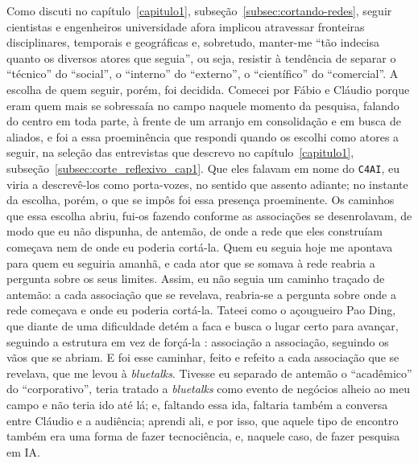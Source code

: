 Como discuti no capítulo~\ref{capitulo1}, subseção~\ref{subsec:cortando-redes}, seguir cientistas e engenheiros universidade afora implicou atravessar fronteiras disciplinares, temporais e geográficas e, sobretudo, manter-me \enquote{tão indecisa quanto os diversos atores que seguia}, ou seja, resistir à tendência de separar o \enquote{técnico} do \enquote{social}, o \enquote{interno} do \enquote{externo}, o \enquote{científico} do \enquote{comercial}. A escolha de quem seguir, porém, foi decidida. Comecei por Fábio e Cláudio porque eram quem mais se sobressaía no campo naquele momento da pesquisa, falando do centro em toda parte, à frente de um arranjo em consolidação e em busca de aliados, e foi a essa proeminência que respondi quando os escolhi como atores a seguir, na seleção das entrevistas que descrevo no capítulo~\ref{capitulo1}, subseção~\ref{subsec:corte_reflexivo_cap1}. Que eles falavam em nome do \texttt{C4AI}, eu viria a descrevê-los como porta-vozes, no sentido que assento adiante; no instante da escolha, porém, o que se impôs foi essa presença proeminente. Os caminhos que essa escolha abriu, fui-os fazendo conforme as associações se desenrolavam, de modo que eu não dispunha, de antemão, de onde a rede que eles construíam começava nem de onde eu poderia cortá-la. Quem eu seguia hoje me apontava para quem eu seguiria amanhã, e cada ator que se somava à rede reabria a pergunta sobre os seus limites. Assim, eu não seguia um caminho traçado de antemão: a cada associação que se revelava, reabria-se a pergunta sobre onde a rede começava e onde eu poderia cortá-la. Tateei como o açougueiro Pao Ding, que diante de uma dificuldade detém a faca e busca o lugar certo para avançar, seguindo a estrutura em vez de forçá-la \parencite[p.~88]{hui2020tecnodiversidade}: associação a associação, seguindo os vãos que se abriam. E foi esse caminhar, feito e refeito a cada associação que se revelava, que me levou à \textit{bluetalks}. Tivesse eu separado de antemão o \enquote{acadêmico} do \enquote{corporativo}, teria tratado a \textit{bluetalks} como evento de negócios alheio ao meu campo e não teria ido até lá; e, faltando essa ida, faltaria também a conversa entre Cláudio e a audiência; aprendi ali, e por isso, que aquele tipo de encontro também era uma forma de fazer tecnociência, e, naquele caso, de fazer pesquisa em IA.

